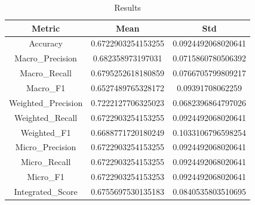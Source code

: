 \begin{table}[htbp]
\centering
\caption{Results}
\label{tab:csv}
\small
\setlength{\tabcolsep}{4pt}
\begin{tabular}{|c|c|c|}
\hline
Metric & Mean & Std \\
\hline
Accuracy & 0.6722903254153255 & 0.0924492068020641 \\
Macro_Precision & 0.682358973197031 & 0.0715860780506392 \\
Macro_Recall & 0.6795252618180859 & 0.0766705799809217 \\
Macro_F1 & 0.6527489765328172 & 0.09391708062259 \\
Weighted_Precision & 0.7222127706325023 & 0.0682396864797026 \\
Weighted_Recall & 0.6722903254153255 & 0.0924492068020641 \\
Weighted_F1 & 0.6688771720180249 & 0.1033106796598254 \\
Micro_Precision & 0.6722903254153255 & 0.0924492068020641 \\
Micro_Recall & 0.6722903254153255 & 0.0924492068020641 \\
Micro_F1 & 0.6722903254153253 & 0.0924492068020641 \\
Integrated_Score & 0.6755697530135183 & 0.0840535803510695 \\
\hline
\end{tabular}
\end{table}